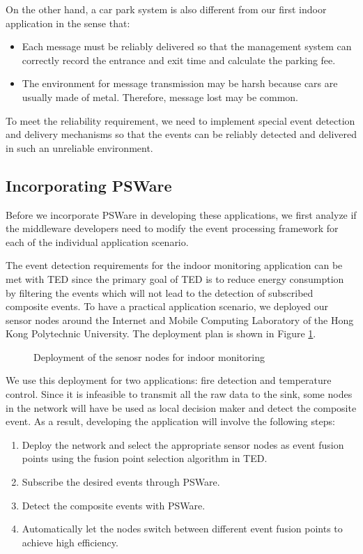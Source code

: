On the other hand, a car park system is also different from our first indoor application in the sense that:
\begin{itemize}
\item Each message must be reliably delivered so that the management system can correctly record the entrance and exit time and calculate the parking fee.
\item The environment for message transmission may be harsh because cars are usually made of metal. Therefore, message lost may be common.
\end{itemize}
To meet the reliability requirement, we need to implement special event detection and delivery mechanisms so that the events can be reliably detected and delivered in such an unreliable environment.

\subsection{Incorporating PSWare}
Before we incorporate PSWare in developing these applications, we first analyze if the middleware developers need to modify the event processing framework for each of the individual application scenario.

The event detection requirements for the indoor monitoring application can be met with TED since the primary goal of TED is to reduce energy consumption by filtering the events which will not lead to the detection of subscribed composite events. To have a practical application scenario, we deployed our sensor nodes around the Internet and Mobile Computing Laboratory of the Hong Kong Polytechnic University. The deployment plan is shown in Figure \ref{fig:indoorDeployment}.

\begin{figure}
\centering
{}
\caption{Deployment of the senosr nodes for indoor monitoring}
\label{fig:indoorDeployment}
\end{figure}

We use this deployment for two applications: fire detection and temperature control. Since it is infeasible to transmit all the raw data to the sink, some nodes in the network will have be used as local decision maker and detect the composite event. As a result, developing the application will involve the following steps:
\begin{enumerate}
\item Deploy the network and select the appropriate sensor nodes as event fusion points using the fusion point selection algorithm in TED.
\item Subscribe the desired events through PSWare.
\item Detect the composite events with PSWare.
\item Automatically let the nodes switch between different event fusion points to achieve high efficiency.
\end{enumerate}

